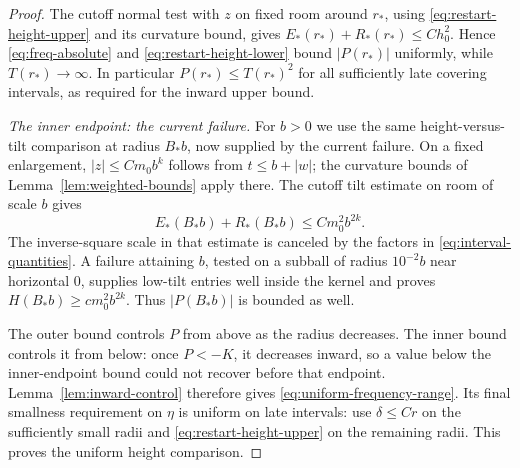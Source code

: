 \begin{proof}
The cutoff normal test with $z$ on fixed room around $r_*$, using
\eqref{eq:restart-height-upper} and its curvature bound, gives
$E_*(r_*)+R_*(r_*)\le Ch_0^2$. Hence
\eqref{eq:freq-absolute} and \eqref{eq:restart-height-lower} bound
$|P(r_*)|$ uniformly, while $T(r_*)\to\infty$.
In particular $P(r_*)\le T(r_*)^2$ for all sufficiently late covering
intervals, as required for the inward upper bound.

\emph{The inner endpoint: the current failure.}
For $b>0$ we use the same height-versus-tilt comparison at radius
$B_*b$, now supplied by the current failure. On a fixed enlargement,
$|z|\le Cm_0b^k$ follows from $t\le b+|w|$; the curvature bounds of
Lemma~\ref{lem:weighted-bounds} apply there. The cutoff tilt estimate
on room of scale $b$ gives
\[
 E_*(B_*b)+R_*(B_*b)\le Cm_0^2b^{2k}.
\]
The inverse-square scale in that estimate is canceled by the factors
in \eqref{eq:interval-quantities}. A failure attaining $b$, tested on
a subball of radius $10^{-2}b$ near horizontal $0$, supplies low-tilt
entries well inside the kernel and proves
$H(B_*b)\ge cm_0^2b^{2k}$. Thus $|P(B_*b)|$ is bounded as well.

The outer bound controls $P$ from above as the radius decreases.
The inner bound controls it from below: once $P<-K$, it decreases
inward, so a value below the inner-endpoint bound could not recover
before that endpoint. Lemma~\ref{lem:inward-control} therefore gives
\eqref{eq:uniform-frequency-range}. Its final smallness requirement
on $\eta$ is uniform on late intervals: use $\delta\le Cr$ on
the sufficiently small radii and
\eqref{eq:restart-height-upper} on the remaining radii.
This proves the uniform height comparison.
\end{proof}
